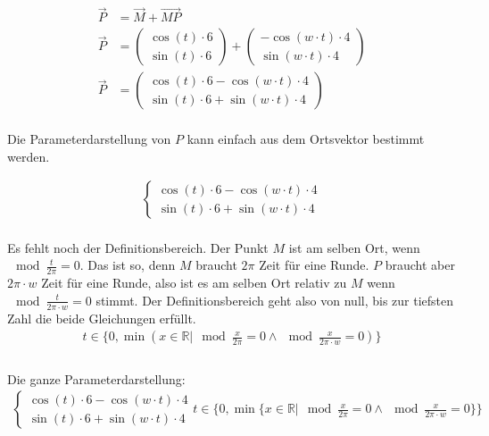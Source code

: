 \documentclass[12pt, a4paper, twoside]{article}
\begin{document}
\begin{align*}
  \overrightarrow{P} & = \overrightarrow{M} + \overrightarrow{MP}               \\
  \overrightarrow{P} & = \begin{pmatrix}
    \cos(t) \cdot 6
    \\
    \sin(t) \cdot 6
  \end{pmatrix} + \begin{pmatrix}
    -\cos(w\cdot t) \cdot 4
    \\
    \sin(w\cdot t) \cdot 4
  \end{pmatrix} \\
  \overrightarrow{P} & = \begin{pmatrix}
    \cos(t)\cdot 6 - \cos(w\cdot t)\cdot 4
    \\
    \sin(t)\cdot 6 + \sin(w\cdot t)\cdot 4
  \end{pmatrix}
\end{align*}
\\

Die Parameterdarstellung von $P$ kann einfach aus dem Ortsvektor bestimmt werden.

\begin{align*}
  \begin{cases}
    \cos(t)\cdot 6 - \cos(w\cdot t)\cdot 4
    \\
    \sin(t)\cdot 6 + \sin(w\cdot t)\cdot 4
  \end{cases}
\end{align*}
\\

Es fehlt noch der Definitionsbereich.
Der Punkt $M$ ist am selben Ort, wenn $\mod{\frac{t}{2\pi}} = 0$.
Das ist so, denn $M$ braucht $2\pi$ Zeit für eine Runde.
$P$ braucht aber $2\pi \cdot w$ Zeit für eine Runde, also ist es am selben Ort relativ zu $M$ wenn $\mod{\frac{t}{2\pi \cdot w}} = 0$ stimmt.
Der Definitionsbereich geht also von null, bis zur tiefsten Zahl die beide Gleichungen erfüllt.\\
\begin{align*}
  t \in \{0, \min(x\in\mathbb{R} | \mod{\frac{x}{2\pi}} = 0 \land\mod{\frac{x}{2\pi \cdot w}} = 0)\} \\
\end{align*}
\\

Die ganze Parameterdarstellung:
\begin{align*}
  \begin{cases}
    \cos(t)\cdot 6 - \cos(w\cdot t)\cdot 4
    \\
    \sin(t)\cdot 6 + \sin(w\cdot t)\cdot 4
  \end{cases}t \in \{0, \min\{x\in\mathbb{R} | \mod{\frac{x}{2\pi}} = 0 \land\mod{\frac{x}{2\pi \cdot w}} = 0\}\} \\
\end{align*}
\\
\end{document}
